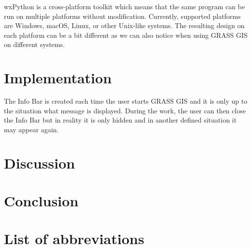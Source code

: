 \documentclass[a4paper,10pt,twoside]{article}
\begin{document}
wxPython is a cross-platform toolkit which means that the same program can be run on multiple platforms without modification. Currently, supported platforms are Windows, macOS, Linux, or other Unix-like systems. The resulting design on each platform can be a bit different as we can also notice when using GRASS GIS on different systems.

\newpage
\vspace*{-1cm}
\section{Implementation}
\noindent
\large
The Info Bar is created each time the user starts GRASS GIS and it is only up to the situation what message is displayed.  During the work, the user can then close the Info Bar but in reality it is only hidden and in another defined situation it may appear again.



\newpage
\vspace*{-1cm}
\section*{Discussion}
\noindent
\large

\newpage
\vspace*{-1cm}
\section*{Conclusion}
\noindent
\large

\newpage
\vspace*{-1cm}
\section*{List of abbreviations}
\noindent
\large
\end{document}
